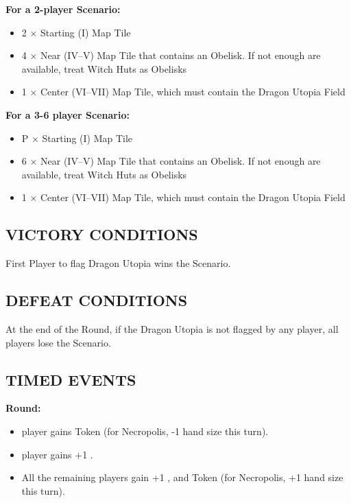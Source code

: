 \begin{multicols}{2}
\textbf{For a 2-player Scenario:}
\begin{itemize}
  \item 2 × Starting (I) Map Tile
  \item 4 × Near (IV--V) Map Tile that contains an Obelisk. If not enough are available, treat Witch Huts as Obelisks
  \item 1 × Center (VI--VII) Map Tile, which must contain the Dragon Utopia Field
\end{itemize}

\textbf{For a 3-6 player Scenario:}
\begin{itemize}
  \item P × Starting (I) Map Tile
  \item 6 × Near (IV--V) Map Tile that contains an Obelisk. If not enough are available, treat Witch Huts as Obelisks
  \item 1 × Center (VI--VII) Map Tile, which must contain the Dragon Utopia Field
\end{itemize}

\subsection*{\MakeUppercase{Victory Conditions}}
First Player to flag Dragon Utopia wins the Scenario.

\subsection*{\MakeUppercase{Defeat Conditions}}
At the end of the  Round, if the Dragon Utopia is not flagged by any player, all players lose the Scenario.

\begin{center}
\end{center}

\subsection*{\MakeUppercase{Timed Events}}

\textbf{ Round:}
\begin{itemize}
  \item {} player gains  Token (for Necropolis, -1 hand size  this turn).
  \item {} player gains +1 .
  \item All the remaining players gain +1 , and  Token (for Necropolis, +1 hand size this turn).
\end{itemize}


\end{multicols}
